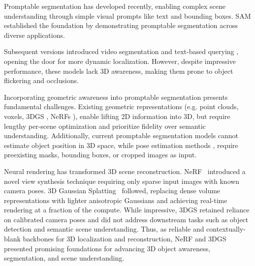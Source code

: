 Promptable segmentation has developed recently, enabling complex scene understanding through simple visual prompts like text and bounding boxes. SAM \cite{sam} established the foundation by demonstrating promptable segmentation across diverse applications.

Subsequent versions introduced video segmentation \cite{sam2} and text-based querying \cite{sam3}, opening the door for more dynamic localization. However, despite impressive performance, these models lack 3D awareness, making them prone to object flickering and occlusions.


Incorporating geometric awareness into promptable segmentation presents fundamental challenges. Existing geometric representations (e.g. point clouds, voxels, 3DGS \cite{3dgs}, NeRFs \cite{nerf}), enable lifting 2D information into 3D, but require lengthy per-scene optimization and prioritize fidelity over semantic understanding. Additionally, current promptable segmentation models cannot estimate object position in 3D space, while pose estimation methods \cite{conceptpose,foundationpose}, require preexisting masks, bounding boxes, or cropped images as input.

Neural rendering has transformed 3D scene reconstruction. NeRF~\cite{nerf} introduced a novel view synthesis technique requiring only sparse input images with known camera poses. 3D Gaussian Splatting~\cite{3dgs} followed, replacing dense volume representations with lighter anisotropic Gaussians and achieving real-time rendering at a fraction of the compute. While impressive, 3DGS retained reliance on calibrated camera poses and did not address downstream tasks such as object detection and semantic scene understanding. Thus, as reliable and contextually-blank backbones for 3D localization and reconstruction, NeRF and 3DGS presented promising foundations for advancing 3D object awareness, segmentation, and scene understanding.


